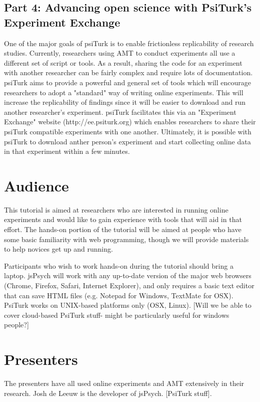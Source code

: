 \documentclass[10pt,letterpaper]{article}
\begin{document}
\subsection{Part 4: Advancing open science with PsiTurk's Experiment Exchange}

One of the major goals of psiTurk is to enable frictionless replicability of research studies.  Currently, researchers using AMT to conduct
experiments all use a different set of script or tools.  As a result, sharing the code for an experiment with another researcher can be fairly complex
and require lots of documentation.  psiTurk aims to provide a powerful and general set of tools which will encourage researchers to adopt
a "standard" way of writing online experiments.  This will increase the replicability of findings since it will be easier to download and run
another researcher's experiment.  psiTurk facilitates this via an "Experiment Exchange" website (http://ee.psiturk.org) which enables researchers 
to share their psiTurk compatible experiments with one another.  Ultimately, it is possible with psiTurk to download anther person's experiment 
and start collecting online data in that experiment within a few minutes.

\section{Audience}

This tutorial is aimed at researchers who are interested in running online experiments and would like to gain experience with tools that will aid in that effort. The hands-on portion of the tutorial will be aimed at people who have some basic familiarity with web programming, though we will provide materials to help novices get up and running. 

Participants who wish to work hands-on during the tutorial should bring a laptop. jsPsych will work with any up-to-date version of the major web browsers (Chrome, Firefox, Safari, Internet Explorer), and only requires a basic text editor that can save HTML files (e.g. Notepad for Windows, TextMate for OSX). PsiTurk works on UNIX-based platforms only (OSX, Linux). [Will we be able to cover cloud-based PsiTurk stuff- might be particularly useful for windows people?]

\section{Presenters}

The presenters have all used online experiments and AMT extensively in their research. Josh de Leeuw is the developer of jsPsych. [PsiTurk stuff].




\setlength{\bibleftmargin}{.125in}
\setlength{\bibindent}{-\bibleftmargin}


\end{document}

